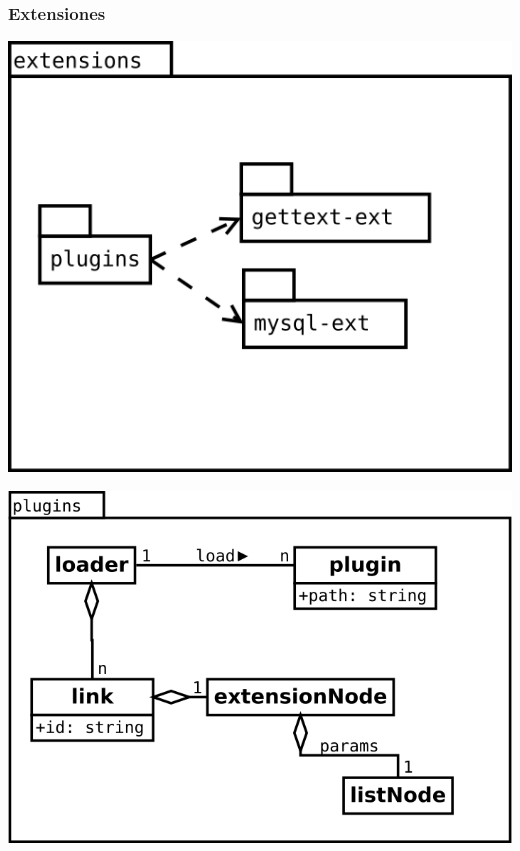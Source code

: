\pagebreak
\subsubsection {Extensiones} 
\begin{center}
\includegraphics[scale=0.4]{extensions-package.png} \\
\end{center}

\begin{center}
\includegraphics[scale=0.4]{plugins.png} \\
\end{center}

